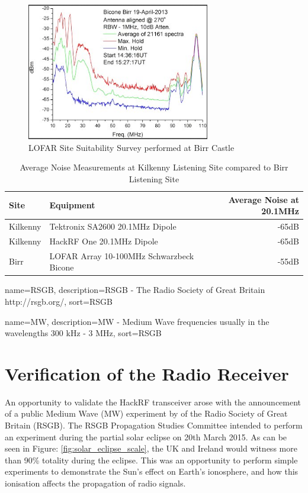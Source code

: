 \documentclass[runningheads,a4paper]{llncs}
\begin{document}
%
\begin{figure}[here]
\centering
\includegraphics[width=8cm]{images/35}
\caption{LOFAR Site Suitability Survey performed at Birr Castle \citep{craf-13}}
\label{fig:site_survey_lofar}
\end{figure}
%

%
\begin{table}
  \centering
  \begin{tabular}{p{2cm} l r}
    \toprule
    Site & Equipment & Average Noise at 20.1MHz \\ \midrule
    Kilkenny & Tektronix SA2600 20.1MHz Dipole & -65dB  \\
    Kilkenny & HackRF One 20.1MHz Dipole & -65dB \\
    Birr & LOFAR Array 10-100MHz Schwarzbeck Bicone & -55dB \\
    \bottomrule
  \end{tabular}
  \caption{Average Noise Measurements at Kilkenny Listening Site compared to Birr Listening Site \citep{craf-13}}
  \label{tab:site_survey}
\end{table}
%

{
  name={RSGB},
  description={RSGB - The Radio Society of Great Britain http://rsgb.org/},
  sort=RSGB
}

{
  name={MW},
  description={MW - Medium Wave frequencies usually in the wavelengths 300 kHz - 3 MHz},
  sort=RSGB
}

\newpage
\section*{Verification of the Radio Receiver}
An opportunity to validate the HackRF transceiver arose with the announcement of a public Medium Wave (\gls{MW}) experiment by \cite{RSGB-15-b} of the Radio Society of Great Britain (\gls{RSGB}). The \gls{RSGB} Propagation Studies Committee intended to perform an experiment during the partial solar eclipse on 20th March 2015. As can be seen in Figure: \ref{fig:solar_eclipse_scale}, the UK and Ireland would witness more than 90\% totality during the eclipse. This was an opportunity to perform simple experiments to demonstrate the Sun's effect on Earth's ionosphere, and how this ionisation affects the propagation of radio signals.
\end{document}

